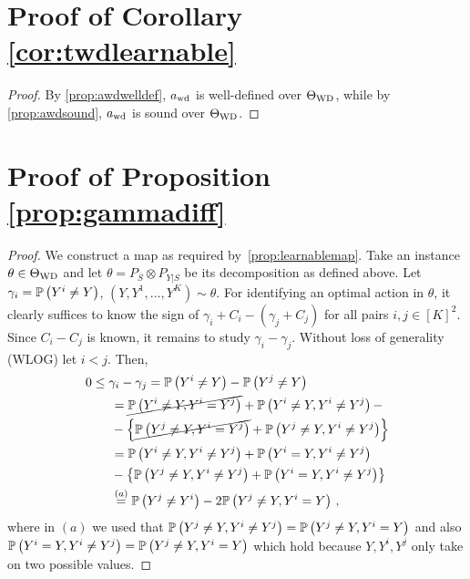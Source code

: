 \section*{Proof of Corollary \ref{cor:twdlearnable}}
\begin{proof}
	By \cref{prop:awdwelldef}, $a_{\mathrm{wd}}$ is well-defined over $\Theta_{\mathrm{WD}}$, while by \cref{prop:awdsound}, $a_{\mathrm{wd}}$ is sound over $\Theta_{\mathrm{WD}}$.
\end{proof}

\section*{Proof of Proposition \ref{prop:gammadiff}}

\begin{proof}
	
	We construct a map as required by~\cref{prop:learnablemap}.
	Take an instance $\theta \in \Theta_{\mathrm{WD}}$ and let $\theta = P_S \otimes P_{Y|S}$ be its decomposition
	as defined above.
	Let $\gamma_i = \mathbb{P}\left(Y^i \ne Y\right)$, $(Y,Y^1,\dots,Y^K)\sim \theta$.
	For identifying an optimal action in $\theta$, it clearly suffices
	to know the sign of $\gamma_i + C_i - (\gamma_j +C_j)$ for all pairs $i,j\in [K]^2$.
	Since $C_i - C_j$ is known, it remains to study $\gamma_i-\gamma_j$.
	Without loss of generality (WLOG) let $i<j$.
	Then, 
	\begin{align*}
	\MoveEqLeft 0  \le \gamma_i  - \gamma_j = \Prob{Y^i\ne Y} - \Prob{Y^j\ne Y} \\
	& = \cancel{\Prob{Y^i\ne Y, Y^i=Y^j}} + \Prob{ Y^i\ne Y, Y^i\ne Y^j } - \\
	& - \left\{ 
	\cancel{\Prob{Y^j\ne Y, Y^i=Y^j}} + \Prob{ Y^j\ne Y, Y^i\ne Y^j }\right\}\\
	& = \Prob{ Y^i\ne Y, Y^i \ne Y^j } + \Prob{Y^i=Y,Y^i\ne Y^j}       \\
	& - \left\{ 
	\Prob{ Y^j \ne Y, Y^i\ne Y^j } + \Prob{ Y^i=Y,Y^i\ne Y^j}
	\right\}\\
	& \stackrel{\footnotesize (a)}{=} \Prob{ Y^j \ne Y^i } -2 \Prob{ Y^j\ne Y, Y^i = Y }\,,
	\end{align*}
	where in $(a)$ we used that $\mathbb{P}\left( Y^j \ne Y, Y^i\ne Y^j \right) =  \mathbb{P}\left( Y^j\ne Y,Y^i= Y\right)$ and also
	$\mathbb{P}\left( Y^i=Y,Y^i\ne Y^j\right) = \mathbb{P}\left( Y^j\ne Y,Y^i= Y\right)$
	which hold because $Y,Y^i,Y^j$ only take on two possible values.
\end{proof}


